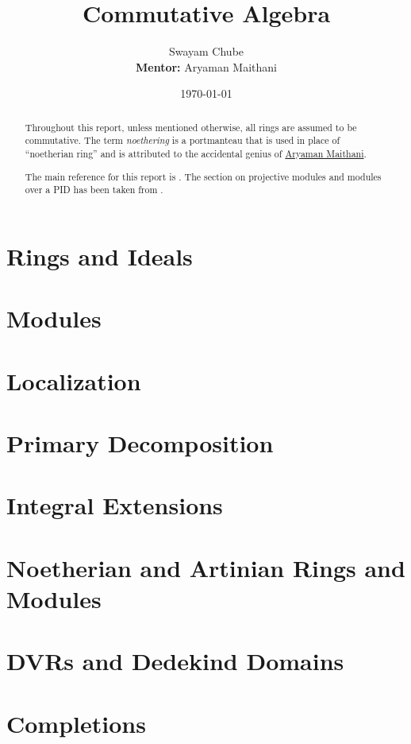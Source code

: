 \documentclass[oneside]{report}
\title{Commutative Algebra}
\author{Swayam Chube\\\textbf{Mentor:} Aryaman Maithani}
\date{\today}
\begin{document}
\maketitle

\begin{abstract}
    Throughout this report, unless mentioned otherwise, all rings are assumed to be commutative. The term \textit{noethering} is a portmanteau that is used in place of ``noetherian ring'' and is attributed to the accidental genius of \href{https://www.youtube.com/live/RrjJfyEF7Ak?feature=share&t=102}{Aryaman Maithani}.

    The main reference for this report is \cite{AM69}. The section on projective modules and modules over a PID has been taken from \cite{Lan02}.
\end{abstract}

\tableofcontents

\chapter{Rings and Ideals}


\chapter{Modules}


\chapter{Localization}


\chapter{Primary Decomposition}


\chapter{Integral Extensions}


\chapter{Noetherian and Artinian Rings and Modules}


\chapter{DVRs and Dedekind Domains}


\chapter{Completions}




\end{document}
